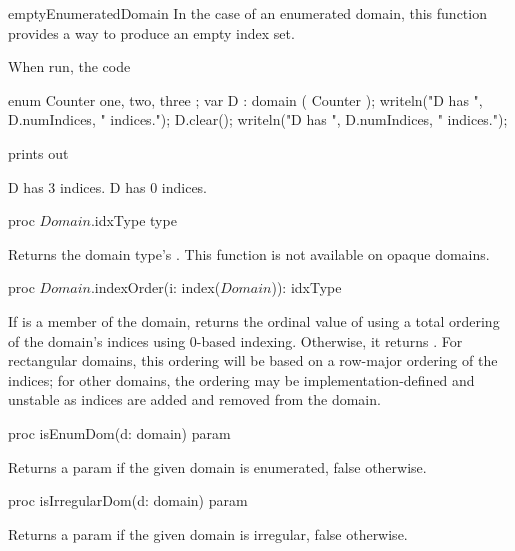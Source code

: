 \begin{chapelexample}{emptyEnumeratedDomain}
In the case of an enumerated domain, this function provides a way to produce an
empty index set.

When run, the code
\begin{chapel}
enum Counter { one, two, three };
var D : domain ( Counter );
writeln("D has ", D.numIndices, " indices.");
D.clear();
writeln("D has ", D.numIndices, " indices.");
\end{chapel}
prints out
\begin{chapelprintoutput}{}
D has 3 indices.
D has 0 indices.
\end{chapelprintoutput}
\end{chapelexample}

\begin{protohead}
proc $Domain$.idxType type
\end{protohead}
\begin{protobody}
Returns the domain type's .
This function is not available on opaque domains.
\end{protobody}

\begin{protohead}
proc $Domain$.indexOrder(i: index($Domain$)): idxType
\end{protohead}
\begin{protobody}
If  is a member of the domain, returns the ordinal value of
 using a total ordering of the domain's indices using 0-based
indexing.  Otherwise, it returns .  For rectangular
domains, this ordering will be based on a row-major ordering of the
indices; for other domains, the ordering may be
implementation-defined and unstable as indices are added and
removed from the domain.
\end{protobody}

\begin{protohead}
proc isEnumDom(d: domain) param
\end{protohead}
\begin{protobody}
Returns a param  if the given domain is enumerated, false otherwise.
\end{protobody}

\begin{protohead}
proc isIrregularDom(d: domain) param
\end{protohead}
\begin{protobody}
Returns a param  if the given domain is irregular, false otherwise.
\end{protobody}

